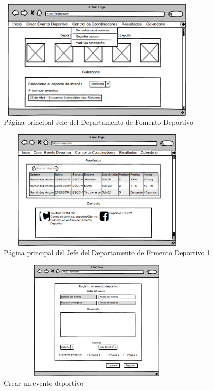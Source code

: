 		\begin{figure}[hbt!]
			\centering
			\includegraphics[width=10cm, height=6cm]{Imagenes/Disenos/p4InicioJefeFDopcipones.png}
			\caption{Página principal Jefe del Departamento de Fomento Deportivo}
			\label{IniciogeneralJFDopciones}
		\end{figure}
	
		\begin{figure}[hbt!]
			\centering
			\includegraphics[width=10cm, height=6cm]{Imagenes/Disenos/p5InicioJefeFD1.png}
			\caption{Página principal del Jefe del Departamento de Fomento Deportivo 1}
			\label{IniciogeneralJFD1}
		\end{figure}
	
		\begin{figure}[hbt!]
			\centering
			\includegraphics[width=10cm, height=6cm]{Imagenes/Disenos/p6Creareventodeportivo.png}
			\caption{Crear un evento deportivo}
			\label{Creareventodeportivo}
		\end{figure}
			\pagebreak
	
